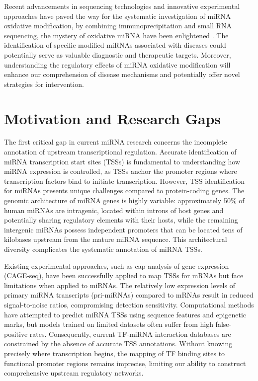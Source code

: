 Recent advancements in sequencing technologies and innovative experimental approaches have paved the way for the systematic investigation of miRNA oxidative modification, by combining immunoprecipitation and small RNA sequencing, the mystery of oxidative miRNA have been enlightened \cite{seok2020position}. The identification of specific modified miRNAs associated with diseases could potentially serve as valuable diagnostic and therapeutic targets. Moreover, understanding the regulatory effects of miRNA oxidative modification will enhance our comprehension of disease mechanisms and potentially offer novel strategies for intervention.

\section{Motivation and Research Gaps}

The first critical gap in current miRNA research concerns the incomplete annotation of upstream transcriptional regulation. Accurate identification of miRNA transcription start sites (TSSs) is fundamental to understanding how miRNA expression is controlled, as TSSs anchor the promoter regions where transcription factors bind to initiate transcription. However, TSS identification for miRNAs presents unique challenges compared to protein-coding genes. The genomic architecture of miRNA genes is highly variable: approximately 50\% of human miRNAs are intragenic, located within introns of host genes and potentially sharing regulatory elements with their hosts, while the remaining intergenic miRNAs possess independent promoters that can be located tens of kilobases upstream from the mature miRNA sequence. This architectural diversity complicates the systematic annotation of miRNA TSSs.

Existing experimental approaches, such as cap analysis of gene expression (CAGE-seq), have been successfully applied to map TSSs for mRNAs but face limitations when applied to miRNAs. The relatively low expression levels of primary miRNA transcripts (pri-miRNAs) compared to mRNAs result in reduced signal-to-noise ratios, compromising detection sensitivity. Computational methods have attempted to predict miRNA TSSs using sequence features and epigenetic marks, but models trained on limited datasets often suffer from high false-positive rates. Consequently, current TF-miRNA interaction databases are constrained by the absence of accurate TSS annotations. Without knowing precisely where transcription begins, the mapping of TF binding sites to functional promoter regions remains imprecise, limiting our ability to construct comprehensive upstream regulatory networks.

